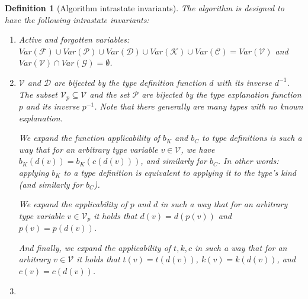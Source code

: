 \documentclass[12pt,a4paper]{article}
\newtheorem{definition}{Definition}
\begin{document}
\begin{definition}[Algorithm intrastate invariants]
    The algorithm is designed to have the following intrastate invariants:


    \begin{enumerate}
        \item Active and forgotten variables: $Var(\mathcal{F}) \cup Var(\mathcal{P}) \cup Var(\mathcal{D}) \cup Var(\mathcal{K}) \cup Var(\mathcal{C}) = Var(\mathcal{V})$ and $Var(\mathcal{V}) \cap Var(\mathcal{G}) = \emptyset$. \label{invVar}

        \item $\mathcal{V}$ and $\mathcal{D}$ are bijected by the type definition function $d$ with its inverse $d^{-1}$. The subset $\mathcal{V}_p \subseteq \mathcal{V}$ and the set $\mathcal{P}$ are bijected by the type explanation function $p$ and its inverse $p^{-1}$. Note that there generally are many types with no known explanation. \label{invPD}

        We expand the function applicability of $b_K$ and $b_C$ to type definitions is such a way that for an arbitrary type variable $v \in \mathcal{V}$, we have $b_K (d (v)) = b_K (c (d (v)))$, and similarly for $b_C$. In other words: applying $b_K$ to a type definition is equivalent to applying it to the type's kind (and similarly for $b_C$).

        We expand the applicability of $p$ and $d$ in such a way that for an arbitrary type variable $v \in \mathcal{V}_p$ it holds that $d(v) = d(p(v))$ and $p(v) = p(d(v))$.

        And finally, we expand the applicability of $t, k, c$ in such a way that for an arbitrary $v \in \mathcal{V}$ it holds that $t (v) = t (d (v))$, $k (v) = k (d (v))$, and $c (v) = c (d (v))$.

        \item 


\end{enumerate}
\end{definition}
\end{document}
